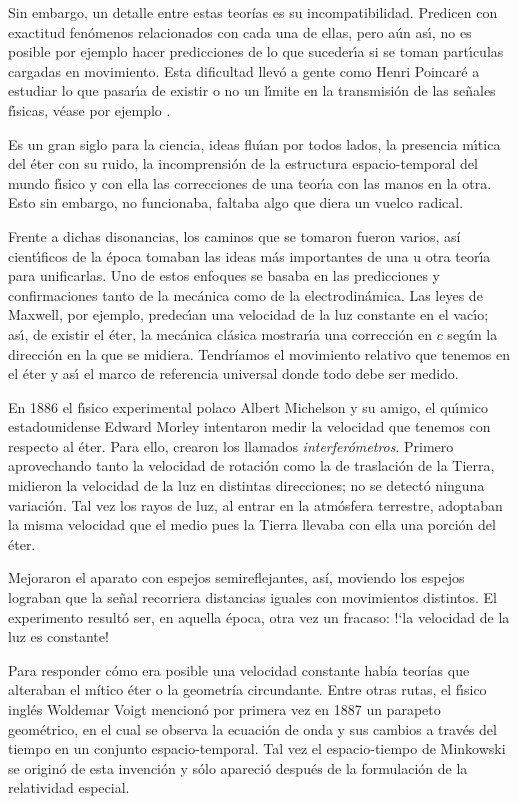 \documentclass[12pt]{article}
\begin{document}
Sin embargo, un detalle entre estas teorías es su incompatibilidad. Predicen con exactitud fen\'omenos relacionados con cada una de ellas, pero a\'un as\'{\i}, no es posible por ejemplo hacer predicciones de lo que suceder\'{\i}a si se toman part\'{\i}culas cargadas en movimiento. Esta dificultad llev\'o a gente como Henri Poincar\'e a estudiar lo que pasar\'{\i}a de existir o no un l\'{\i}mite en la transmisi\'on de las se\~nales f\'{\i}sicas, véase por ejemplo \cite{Auf}.

Es un gran siglo para la ciencia, ideas flu\'{\i}an por todos lados, la presencia m\'{\i}tica del \'eter con su ruido, la incomprensi\'on de la estructura espacio-temporal del mundo f\'{\i}sico y con ella las correcciones de una teor\'{\i}a con las manos en la otra. Esto sin embargo, no funcionaba, faltaba algo que diera un vuelco radical.

Frente a dichas disonancias, los caminos que se tomaron fueron varios, así cient\'{\i}ficos de la \'epoca tomaban las ideas m\'as importantes de una u otra teor\'{\i}a para unificarlas. Uno de estos enfoques se basaba en las predicciones y confirmaciones tanto de la mec\'anica como de la electrodin\'amica. Las leyes de Maxwell, por ejemplo, predec\'{\i}an una velocidad de la luz constante en el vac\'{\i}o; as\'{\i}, de existir el \'eter, la mec\'anica cl\'asica mostrar\'{\i}a una correcci\'on en $c$ seg\'un la direcci\'on en la que se midiera. Tendríamos el movimiento relativo que tenemos en el \'eter y as\'{\i} el marco de referencia universal donde todo debe ser medido.

En 1886 el f\'{\i}sico experimental polaco Albert Michelson y su amigo, el qu\'{\i}mico estadounidense Edward Morley intentaron medir la velocidad que tenemos con respecto al \'eter. Para ello, crearon los llamados {\it interfer\'ometros}. Primero aprovechando tanto la velocidad de rotaci\'on como la de traslaci\'on de la Tierra, midieron la velocidad de la luz en distintas direcciones; no se detect\'o ninguna variación. Tal vez los rayos de luz, al entrar en la atm\'osfera terrestre, adoptaban la misma velocidad que el medio pues la Tierra llevaba con ella una porci\'on del \'eter.

Mejoraron el aparato con espejos semireflejantes, así, moviendo los espejos lograban que la se\~nal recorriera distancias iguales con movimientos distintos. El experimento result\'o ser, en aquella \'epoca, otra vez un fracaso: !`la velocidad de la luz es constante!

Para responder cómo era posible una velocidad constante había teorías que alteraban el mítico éter o la geometría circundante. Entre otras rutas, el f\'{\i}sico ingl\'es Woldemar Voigt mencionó por primera vez en 1887 un parapeto geom\'etrico, en el cual se observa la ecuaci\'on de onda y sus cambios a trav\'es del tiempo en un conjunto espacio-temporal. Tal vez el espacio-tiempo de  Minkowski se origin\'o de esta invenci\'on y sólo apareció después de la formulaci\'on de la relatividad especial.
\end{document}
